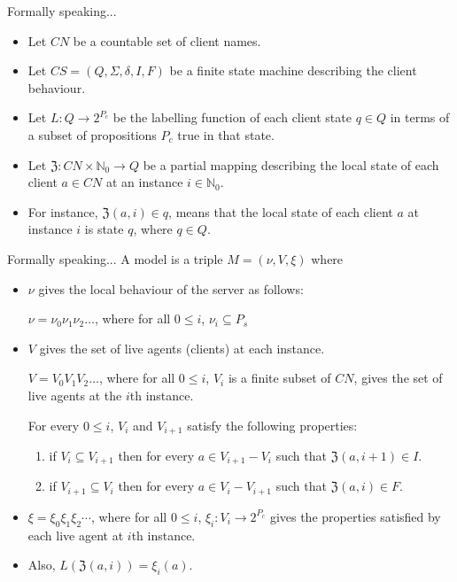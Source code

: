 \documentclass [serif,professionalfont]{beamer}
\begin{document}
\begin{frame}{Formally speaking...}
    \begin{itemize}
        \item Let $CN$ be a \colorbox{green!30}{countable set of client names}. \pause
        \item Let $CS = (Q,\Sigma,\delta,I,F)$ be a \colorbox{green!30}{finite state machine describing the client behaviour}. \pause
        \item Let $L:Q \to 2^{P_c}$ be the labelling function of each client state  $q \in Q$ in terms of a \colorbox{green!30}{subset of propositions $P_c$ true in that state}. \pause

        \item Let $\mathfrak{Z}:CN \times \mathbb{N}_0 \to Q$ be a partial mapping describing the local state of each client $a \in CN$ at an instance $i \in \mathbb{N}_0$. \pause
              \item[-]For instance, $\mathfrak{Z}(a,i)\in q$, means that the \colorbox{green!30}{local state of each client $a$ at instance $i$ is state $q$}, where $q \in Q$.
    \end{itemize}
\end{frame}


\begin{frame}{Formally speaking...}
    A model is a triple $M=(\nu,V,\xi)$ where
    \begin{itemize}
        \item $\nu$ gives the \colorbox{green!30}{local behaviour of the server} as follows:

              $\nu=\nu_0\nu_1\nu_2\ldots$, where for all $0 \le i$, $\nu_i \subseteq P_s$ \pause

        \item $V$ gives the \colorbox{green!30}{set of live agents (clients) at each instance}.

              $V=V_0V_1V_2\ldots$, where for all $0 \le i$, $V_i$ is a finite subset of $CN$, gives the set of live agents at the $i$th instance.

              For every $0\le i$, $V_i$ and $V_{i+1}$ satisfy  the following properties:
              \begin{enumerate}
                  \item if $V_i \subseteq V_{i+1}$ then for every $a \in V_{i+1}-V_i$ such that $\mathfrak{Z}(a,i+1)\in I$.
                  \item if $V_{i+1}\subseteq V_i$ then for every $a \in V_i-V_{i+1}$ such that $\mathfrak{Z}(a,i)\in F$.
              \end{enumerate} \pause

        \item $\xi=\xi_0\xi_1\xi_2\cdots$, where for all $0 \le i$, $\xi_i:V_i\to 2^{P_c}$ gives \colorbox{green!30}{the properties satisfied by each live agent at $i$th instance.}
              \item[]Also, $L(\mathfrak{Z}(a,i))=\xi_i(a)$. %
    \end{itemize}
\end{frame}
\end{document}
